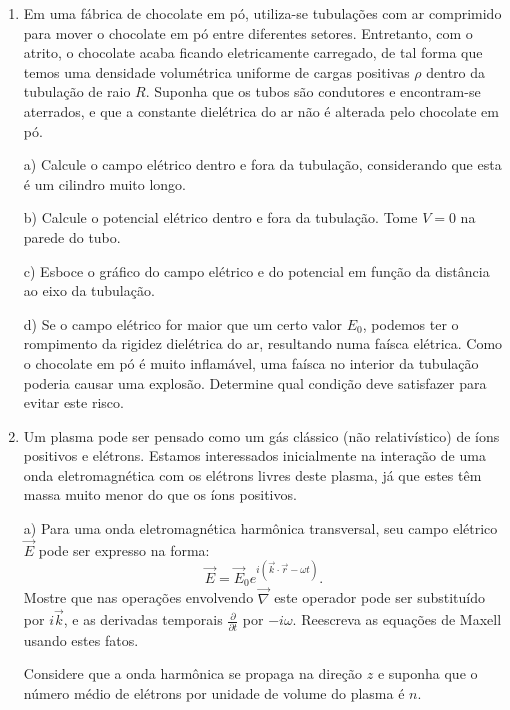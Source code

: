 \begin{enumerate}[start=1,label={\bfseries Q\arabic*.}]
\resposta



\item Em uma fábrica de chocolate em pó, utiliza-se tubulações com ar comprimido para mover o chocolate em pó entre diferentes setores. Entretanto, com o atrito, o chocolate acaba ficando eletricamente carregado, de tal forma que temos uma densidade volumétrica uniforme de cargas positivas $\rho$ dentro da tubulação de raio $R$. Suponha que os tubos são condutores e encontram-se aterrados, e que a constante dielétrica do ar não é alterada pelo chocolate em pó.

a) Calcule o campo elétrico dentro e fora da tubulação, considerando que esta é um cilindro muito longo.

\resposta

b) Calcule o potencial elétrico dentro e fora da tubulação. Tome $V = 0$ na parede do tubo.

\resposta

c) Esboce o gráfico do campo elétrico e do potencial em função da distância ao eixo da tubulação.

\resposta

d) Se o campo elétrico for maior que um certo valor $E_{0}$, podemos ter o rompimento da rigidez dielétrica do ar, resultando numa faísca elétrica. Como o chocolate em pó é muito inflamável, uma faísca no interior da tubulação poderia causar uma explosão. Determine qual condição deve satisfazer para evitar este risco.

\resposta


\item Um plasma pode ser pensado como um gás clássico (não relativístico) de íons positivos e elétrons. Estamos interessados inicialmente na interação de uma onda eletromagnética com os elétrons livres deste plasma, já que estes têm massa muito menor do que os íons positivos.

a) Para uma onda eletromagnética harmônica transversal, seu campo elétrico $\vec{E}$ pode ser expresso na forma:
$$
\vec{E} = \vec{E}_{0} e^{i(\vec{k} \cdot \vec{r} - \omega t)}.
$$
Mostre que nas operações envolvendo $\vec{\nabla}$ este operador pode ser substituído por $i\vec{k}$, e as derivadas temporais $\frac{\partial}{\partial t}$ por $-i \omega$. Reescreva as equações de Maxell usando estes fatos.

\resposta

Considere que a onda harmônica se propaga na direção $z$ e suponha que o número médio de elétrons por unidade de volume do plasma é $n$.


\end{enumerate}
